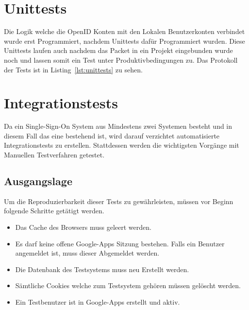 
\section{Unittests}
\label{sec:unittests}
Die Logik welche die OpenID Konten mit den Lokalen Benutzerkonten verbindet wurde erst Programmiert, nachdem Unittests dafür Programmiert wurden. Diese Unittests laufen auch nachdem das Packet in ein Projekt eingebunden wurde noch und lassen somit ein Test unter Produktivbedingungen zu. Das Protokoll der Tests ist in Listing~\ref{lst:unittests} zu sehen.

{\minipage{\linewidth}
  
\endminipage}

\section{Integrationstests}
\label{sec:integrationstests}
Da ein Single-Sign-On System aus Mindestens zwei Systemen besteht und in diesem Fall das eine bestehend ist, wird darauf verzichtet automatisierte Integrationstests zu erstellen. Stattdessen werden die wichtigsten Vorgänge mit Manuellen Testverfahren getestet.

\subsection{Ausgangslage}
\label{sub:TestingAusgangslage}
Um die Reproduzierbarkeit dieser Tests zu gewährleisten, müssen vor Beginn folgende Schritte getätigt werden.

\begin{itemize}
    \item Das Cache des Browsers muss geleert werden.
    \item Es darf keine offene Google-Apps Sitzung bestehen. Falls ein Benutzer
          angemeldet ist, muss dieser Abgemeldet werden.
    \item Die Datenbank des Testsystems muss neu Erstellt werden.
    \item Sämtliche Cookies welche zum Testsystem gehören müssen gelöscht
          werden.
    \item Ein Testbenutzer ist in Google-Apps erstellt und aktiv.
\end{itemize}

